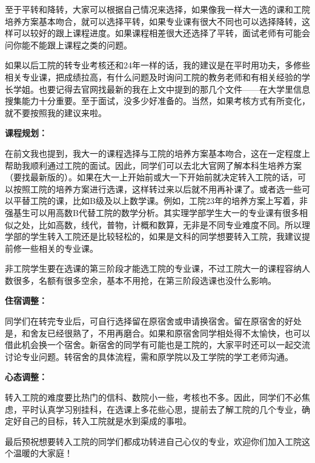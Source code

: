 \documentclass[11pt,oneside]{book}
\begin{document}
\vspace{10pt}

至于平转和降转，大家可以根据自己情况来选择，如果像我一样大一选的课和工院培养方案基本吻合，就可以选择平转，如果专业课有很大不同也可以选择降转，这样可以较好的跟上课程进度。如果课程相差很大还选择了平转，面试老师有可能会问你能不能跟上课程之类的问题。

\vspace{10pt}

如果以后工院的转专业考核还和24年一样的话，我的建议是在平时用功夫，多修些相关专业课，把成绩拉高，有什么问题及时询问工院的教务老师和有相关经验的学长学姐。也要记得去官网找最新的我在上文中提到的那几个文件——在大学里信息搜集能力十分重要。至于面试，没多少好准备的。当然，如果考核方式有所变化，就不要按照我的建议来啦。

\textbf{课程规划：}

在前文我也提到，我大一的课程选择与工院的培养方案基本吻合，这在一定程度上帮助我顺利通过工院的面试。因此，同学们可以去北大官网了解本科生培养方案（要找最新版的）。如果在大一上开始前或大一下开始前就决定转入工院的话，可以按照工院的培养方案进行选课，这样转过来以后就不用再补课了。或者选一些可以平替工院的课，比如B级及以上数学课。例如，工院23年的培养方案上写着，非强基生可以用高数B代替工院的数学分析。其实理学部学生大一的专业课有很多相似之处，比如高数，线代，普物，计概和数算，无非是不同专业难度不同。所以理学部的学生转入工院还是比较轻松的，如果是文科的同学想要转入工院，我建议提前修一些相关的专业课。

\vspace{10pt}

非工院学生要在选课的第三阶段才能选工院的专业课，不过工院大一的课程容纳人数很多，名额有很多空余，基本不用抢，在第三阶段选课也没什么影响。

\textbf{住宿调整：}

同学们在转完专业后，可自行选择留在原宿舍或申请换宿舍。留在原宿舍的好处是，和舍友已经很熟了，不用再磨合。如果和原宿舍同学相处得不太愉快，也可以借此机会换一个宿舍。新宿舍的同学有可能也是工院的，大家平时还可以一起交流讨论专业问题。转宿舍的具体流程，需和原学院以及工学院的学工老师沟通。

\textbf{心态调整：}

转入工院的难度要比热门的信科、数院小一些，考核也不多。因此，同学们不必焦虑，平时认真学习别挂科，在选课上多花些心思，提前去了解工院的几个专业，确定好自己的目标，转入工院就是水到渠成的事啦。

\vspace{10pt}

最后预祝想要转入工院的同学们都成功转进自己心仪的专业，欢迎你们加入工院这个温暖的大家庭！
\end{document}
